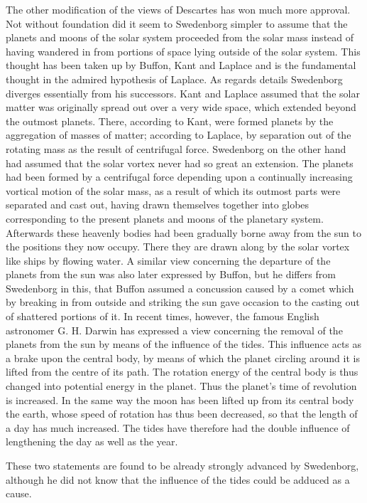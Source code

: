 \documentclass[a4paper, 11pt, oneside, polutonikogreek, english]{article}
\begin{document}
The other modification of the views of Descartes has won much more approval. Not without foundation did it seem to Swedenborg simpler to assume that the planets and moons of the solar system proceeded from the solar mass instead of having wandered in from portions of space lying outside of the solar system. This thought has been taken up by Buffon, Kant and Laplace and is the fundamental thought in the admired hypothesis of Laplace. As regards details Swedenborg diverges essentially from his successors. Kant and Laplace assumed that the solar matter was originally spread out over a very wide space, which extended beyond the outmost planets. There, according to Kant, were formed planets by the aggregation of masses of matter; according to Laplace, by separation out of the rotating mass as the result of centrifugal force. Swedenborg on the other hand had assumed that the solar vortex never had so great an extension. The planets had been formed by a centrifugal force depending upon a continually increasing vortical motion of the solar mass, as a result of which its outmost parts were separated and cast out, having drawn themselves together into globes corresponding to the present planets and moons of the planetary system. Afterwards these heavenly bodies had been gradually borne away from the sun to the positions they now occupy. There they are drawn along by the solar vortex like ships by flowing water. A similar view concerning the departure of the planets from the sun was also later expressed by Buffon, but he differs from Swedenborg in this, that Buffon assumed a concussion caused by a comet which by breaking in from outside and striking the sun gave occasion to the casting out of shattered portions of it. In recent times, however, the famous English astronomer G. H. Darwin has expressed a view concerning the removal of the planets from the sun by means of the influence of the tides. This influence acts as a brake upon the central body, by means of which the planet circling around it is lifted from the centre of its path. The rotation energy of the central body is thus changed into potential energy in the planet. Thus the planet's time of revolution is increased. In the same way the moon has been lifted up from its central body the earth, whose speed of rotation has thus been decreased, so that the length of a day has much increased. The tides have therefore had the double influence of lengthening the day as well as the year.

These two statements are found to be already strongly advanced by Swedenborg, although he did not know that the influence of the tides could be adduced as a cause.
\end{document}
